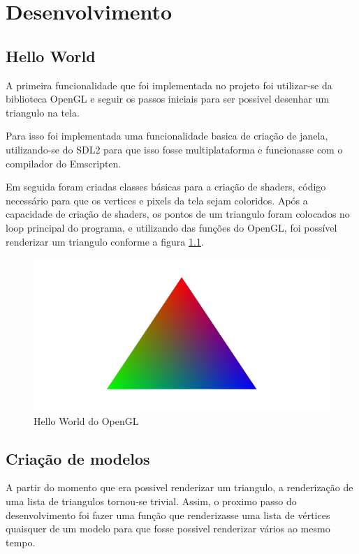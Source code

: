 \chapter{Desenvolvimento}
\label{cap:desenvolvimento}

\section{Hello World}

A primeira funcionalidade que foi implementada no projeto foi utilizar-se da biblioteca OpenGL e seguir os passos iniciais para ser possivel desenhar um triangulo na tela. 

Para isso foi implementada uma funcionalidade basica de criação de janela, utilizando-se do SDL2 para que isso fosse multiplataforma e funcionasse com o compilador do Emscripten.

Em seguida foram criadas classes básicas para a criação de shaders, código necessário para que os vertices e pixels da tela sejam coloridos. Após a capacidade de criação de shaders, os pontos de um triangulo foram colocados no loop principal do programa, e utilizando das funções do OpenGL, foi possível renderizar um triangulo conforme a figura \ref{des:glhello}.

\begin{figure}[]
  \includegraphics[width=\linewidth]{Cap-Desenvolvimento/glhello.png}
  \caption{Hello World do OpenGL}
  \label{des:glhello}
\end{figure}

\section{Criação de modelos}

A partir do momento que era possivel renderizar um triangulo, a renderização de uma lista de triangulos tornou-se trivial. Assim, o proximo passo do desenvolvimento foi fazer uma função que renderizasse uma lista de vértices quaisquer de um modelo para que fosse possivel renderizar vários ao mesmo tempo.

